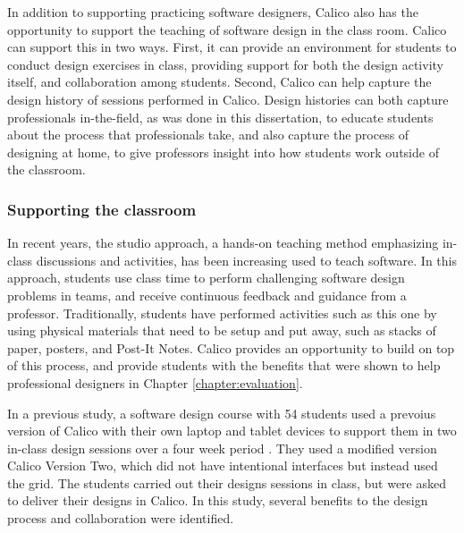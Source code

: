 In addition to supporting practicing software designers, Calico also has the opportunity to support the teaching of software design in the class room. Calico can support this in two ways. First, it can provide an environment for students to conduct design exercises in class, providing support for both the design activity itself, and collaboration among students. Second, Calico can help capture the design history of sessions performed in Calico. Design histories can both capture professionals in-the-field, as was done in this dissertation, to educate students about the process that professionals take, and also capture the process of designing at home, to give professors insight into how students work outside of the classroom.

\subsubsection{Supporting the classroom}

In recent years, the studio approach, a hands-on teaching method emphasizing in-class discussions and activities, has been increasing used to teach software. In this approach, students use class time to perform challenging software design problems in teams, and receive continuous feedback and guidance from a professor. Traditionally, students have performed activities such as this one by using physical materials that need to be setup and put away, such as stacks of paper, posters, and Post-It Notes. Calico provides an opportunity to build on top of this process, and provide students with the benefits that were shown to help professional designers in Chapter \ref{chapter:evaluation}. 

In a previous study, a software design course with 54 students used a prevoius version of Calico with their own laptop and tablet devices to support them in two in-class design sessions over a four week period \cite{Loksa2013}. They used a modified version Calico Version Two, which did not have intentional interfaces but instead used the grid. The students carried out their designs sessions in class, but were asked to deliver their designs in Calico. In this study, several benefits to the design process and collaboration were identified.

%
%

